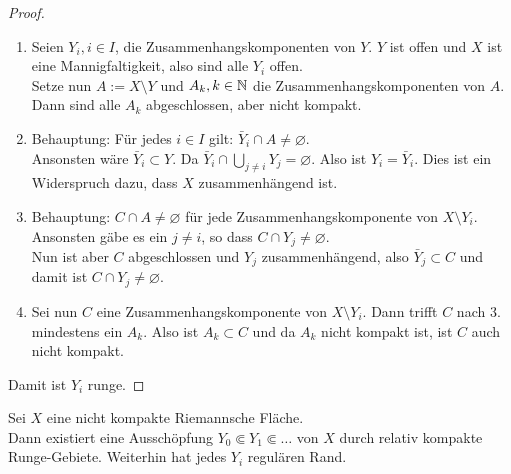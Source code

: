 \begin{proof}
  \begin{enumerate}
  \item Seien $Y_i, i \in I$, die Zusammenhangskomponenten von
    $Y$. $Y$ ist offen und $X$ ist eine Mannigfaltigkeit, also sind
    alle $Y_i$ offen. \\
    Setze nun $A := X \setminus Y$ und $A_k, k\in \mathbb{N}$ die
    Zusammenhangskomponenten von $A$. Dann sind alle $A_k$
    abgeschlossen, aber nicht kompakt.
  \item Behauptung: Für jedes $i \in I$ gilt: $\bar Y_i \cap A \neq
    \varnothing$.\\
    Ansonsten wäre $\bar Y_i \subset Y$. Da $\bar Y_i \cap \bigcup_{j
      \neq i} Y_j = \varnothing$. Also ist $Y_i = \bar Y_i$. Dies
    ist ein Widerspruch dazu, dass $X$ zusammenhängend ist.
  \item Behauptung: $C \cap A \neq \varnothing$ für jede
    Zusammenhangskomponente von $X \setminus Y_i$. \\
    Ansonsten gäbe es ein $j \neq i$, so dass $C \cap Y_j \neq
    \varnothing$. \\
    Nun ist aber $C$ abgeschlossen und $Y_j$ zusammenhängend, also
    $\bar Y_j \subset C$ und damit ist $C \cap Y_j \neq \varnothing$.
  \item Sei nun $C$ eine Zusammenhangskomponente von $X \setminus
    Y_i$. Dann trifft $C$ nach 3. mindestens ein $A_k$. Also ist $A_k
    \subset C$ und da $A_k$ nicht kompakt ist, ist $C$ auch nicht kompakt.
  \end{enumerate}
  Damit ist $Y_i$ runge.
\end{proof}

\begin{thm}
  \label{thm:Ausschöpfung-Runge}
  Sei $X$ eine nicht kompakte Riemannsche Fläche. \\
  Dann existiert eine Ausschöpfung $Y_0 \Subset Y_1 \Subset \dots$ von
  $X$ durch relativ kompakte Runge-Gebiete. Weiterhin hat jedes $Y_i$
  regulären Rand.
\end{thm}

